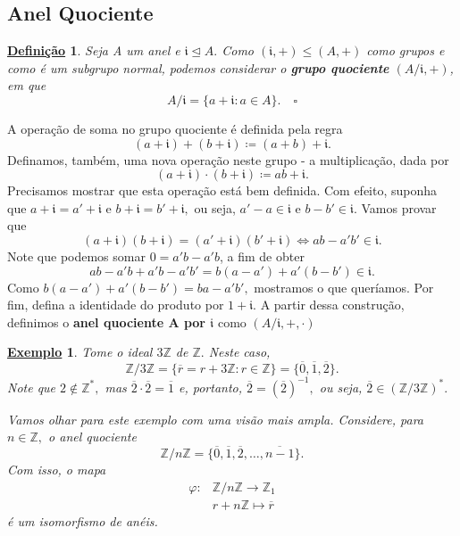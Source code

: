 \documentclass{article}
\newtheorem*{def*}{\underline{Defini\c c\~ao}}
\newtheorem{example}{\underline{Exemplo}}
\begin{document}
\subsection{Anel Quociente}
\begin{def*}
  Seja A um anel e \(\mathfrak{i}\trianglelefteq{A}.\) Como \((\mathfrak{i}, +)\leq (A, +)\) como grupos e
  como é um subgrupo normal, podemos considerar o \textbf{grupo quociente} \((A/\mathfrak{i}, +)\), em que 
  \[
    A/\mathfrak{i} = \{a + \mathfrak{i}: a \in A\}.\quad\square
  \]
\end{def*}
A operação de soma no grupo quociente é definida pela regra 
\[
  (a+\mathfrak{i})+(b+\mathfrak{i})\coloneqq (a+b)+\mathfrak{i}.
\]
Definamos, também, uma nova operação neste grupo - a multiplicação, dada por 
\[
  (a+\mathfrak{i})\cdot (b+\mathfrak{i})\coloneqq ab + \mathfrak{i}. 
\]
Precisamos mostrar que esta operação está bem definida. Com efeito, suponha que
\(a+\mathfrak{i} = a'+\mathfrak{i}\) e \(b+\mathfrak{i} = b'+\mathfrak{i},\) ou seja,
\(a'-a\in \mathfrak{i}\) e \(b-b'\in \mathfrak{i}.\) Vamos provar que 
\[
  (a+\mathfrak{i})(b+\mathfrak{i}) = (a'+\mathfrak{i})(b'+\mathfrak{i}) \Longleftrightarrow ab - a'b'\in \mathfrak{i}.
\]
Note que podemos somar \(0=a'b-a'b\), a fim de obter 
\[
  ab - a'b + a'b - a'b' = b(a-a') + a'(b-b')\in \mathfrak{i}.
\] 
Como \(b(a-a') + a'(b-b') = ba - a'b',\) mostramos o que queríamos. Por fim,
defina a identidade do produto por \(1 + \mathfrak{i}.\) A partir dessa construção,
definimos o \textbf{anel quociente A por \(\mathfrak{i}\)} como \((A/\mathfrak{i}, +, \cdot )\)
\begin{example}
  Tome o ideal \(3 \mathbb{Z}\) de \(\mathbb{Z}.\) Neste caso, 
    \[
      \mathbb{Z}/3 \mathbb{Z} = \{\overline{r} = r + 3 \mathbb{Z}:r\in \mathbb{Z}\} = \{\overline{0}, \overline{1}, \overline{2}\}.
    \]
Note que \(2\not\in \mathbb{Z}^{*},\) mas \(\overline{2}\cdot \overline{2} = \overline{1}\) e, portanto, \(\overline{2} = (\overline{2})^{-1},\) ou seja,
 \(\overline{2}\in (\mathbb{Z}/3 \mathbb{Z})^{*}.\)

  Vamos olhar para este exemplo com uma visão mais ampla. Considere, para \(n\in \mathbb{Z},\) o anel quociente 
  \[
    \mathbb{Z}/n \mathbb{Z} = \{\overline{0}, \overline{1}, \overline{2}, \dotsc , \overline{n-1}\}.
  \]
  Com isso, o mapa 
 \begin{align*}
  \varphi : &\mathbb{Z}/n \mathbb{Z}\rightarrow \mathbb{Z}_{1}\\
            &r + n\mathbb{Z}\mapsto \overline{r}
 \end{align*}
 é um isomorfismo de anéis.
\end{example}
\end{document}
